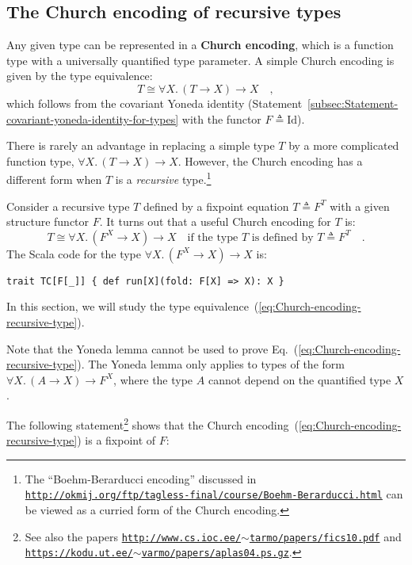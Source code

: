 \subsection{The Church encoding of recursive types\label{subsec:The-Church-encoding-of-recursive-types}}

Any given type can be represented in a \textbf{Church encoding},
which is a function type with a universally quantified type parameter.
A simple Church encoding is given by the type equivalence:
\[
T\cong\forall X.\,\left(T\rightarrow X\right)\rightarrow X\quad,
\]
which follows from the covariant Yoneda identity (Statement~\ref{subsec:Statement-covariant-yoneda-identity-for-types}
with the functor $F\triangleq\text{Id}$). 

There is rarely an advantage in replacing a simple type $T$ by a
more complicated function type, $\forall X.\,(T\rightarrow X)\rightarrow X$.
However, the Church encoding has a different form when $T$ is a \emph{recursive}
type.\footnote{The \textsf{``}Boehm-Berarducci encoding\textsf{''} discussed in \texttt{\href{http://okmij.org/ftp/tagless-final/course/Boehm-Berarducci.html}{http://okmij.org/ftp/tagless-final/course/Boehm-Berarducci.html}}
can be viewed as a curried form of the Church encoding.}

Consider a recursive type $T$ defined by a fixpoint equation $T\triangleq F^{T}$
with a given structure functor $F$. It turns out that a useful Church
encoding for $T$ is:
\begin{equation}
T\cong\forall X.\,(F^{X}\rightarrow X)\rightarrow X\quad\text{if the type }T\text{ is defined by }T\triangleq F^{T}\quad.\label{eq:Church-encoding-recursive-type}
\end{equation}
The Scala code for the type $\forall X.\,(F^{X}\rightarrow X)\rightarrow X$
is:
\begin{lstlisting}
trait TC[F[_]] { def run[X](fold: F[X] => X): X }
\end{lstlisting}
In this section, we will study the type equivalence~(\ref{eq:Church-encoding-recursive-type}).

Note that the Yoneda lemma cannot be used to prove Eq.~(\ref{eq:Church-encoding-recursive-type}).
The Yoneda lemma only applies to types of the form $\forall X.\,(A\rightarrow X)\rightarrow F^{X}$,
where the type $A$ cannot depend on the quantified type $X$. 

The following statement\footnote{See also the papers \texttt{\href{https://web.archive.org/web/20110601105059/http://www.cs.ioc.ee/~tarmo/papers/fics10.pdf}{http://www.cs.ioc.ee/$\sim$tarmo/papers/fics10.pdf}}
and \texttt{\href{https://kodu.ut.ee/~varmo/papers/aplas04.ps.gz}{https://kodu.ut.ee/$\sim$varmo/papers/aplas04.ps.gz}}.} shows that the Church encoding~(\ref{eq:Church-encoding-recursive-type})
is a fixpoint of $F$:

